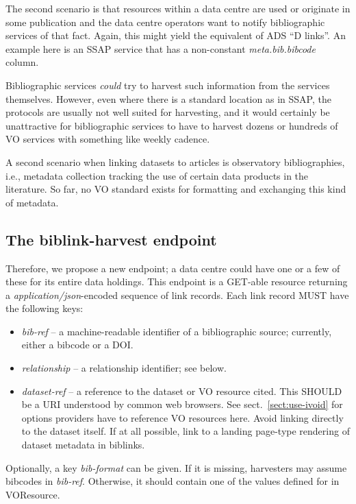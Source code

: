 \documentclass[11pt,a4paper]{ivoa}
\begin{document}
The second scenario is that resources within a data centre are used or
originate in some publication and the data centre operators want to
notify bibliographic services of that fact.  Again, this might yield the
equivalent of ADS ``D links''.  An example here is an SSAP
\citep{2012ivoa.spec.0210T} service that has a non-constant
\textsl{meta.bib.bibcode} column.

Bibliographic services \emph{could} try to harvest such information from
the services themselves.  However, even where there is a standard
location as in SSAP, the protocols are usually not well suited for
harvesting, and it would certainly be unattractive for bibliographic
services to have to harvest dozens or hundreds of VO services with
something like weekly cadence.

A second scenario when linking datasets to articles is observatory
bibliographies, i.e., metadata collection tracking the use of certain
data products in the literature.  So far, no VO standard exists for
formatting and exchanging this kind of metadata.


\subsection{The biblink-harvest endpoint}

Therefore, we propose a new endpoint; a data centre could have one or a
few of these for its entire data holdings.  This endpoint is a GET-able
resource returning a \textit{application/json}-encoded sequence of link
records.  Each link record MUST have the following keys:

\begin{itemize}
\item \textit{bib-ref} -- a machine-readable identifier of a bibliographic
source; currently, either a bibcode or a DOI.
\item \textit{relationship} -- a relationship identifier; see below.
\item \textit{dataset-ref} -- a reference to the dataset or VO resource cited.
This SHOULD be a URI understood by common web browsers.  See
sect.~\ref{sect:use-ivoid} for options providers have to reference VO
resources here.  Avoid linking directly to the dataset itself.  If at
all possible, link to a landing page-type rendering of dataset metadata
in biblinks.
\end{itemize}

Optionally, a key \textit{bib-format} can be given.  If it is missing,
harvesters may assume bibcodes in \textit{bib-ref}.  Otherwise, it should
contain one of the values defined for  in
VOResource.
\end{document}
